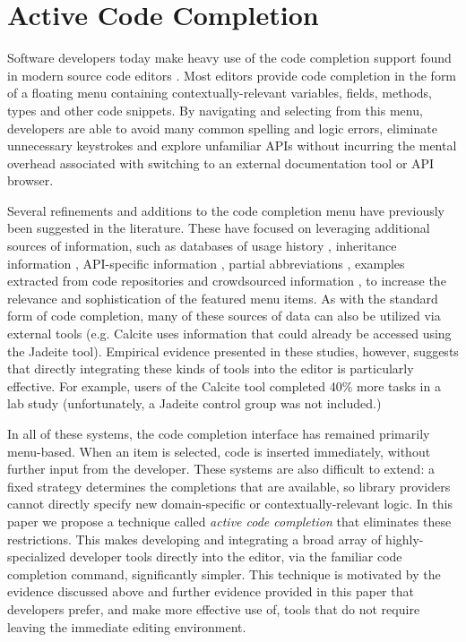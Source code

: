\section{Active Code Completion}\label{acc}
Software developers today make heavy use of the code completion support found in modern source code editors  \cite{murphy_how_2006}. Most editors provide code completion in the form of a floating menu containing  contextually-relevant variables, fields, methods, types and other code snippets. By navigating and selecting from this menu, developers are able to avoid many common spelling and logic errors, eliminate unnecessary keystrokes and explore unfamiliar APIs without incurring the mental overhead associated with switching to an external documentation tool or API browser.

Several refinements and additions to the code completion menu have previously been suggested in the literature. These have focused on leveraging additional sources of information, such as databases of usage history \cite{robbes_how_2008}\cite{HouPletcher2011}, inheritance information \cite{HouPletcher2011}, API-specific information \cite{HouPletcher2011}\cite{Lee+2008}, partial abbreviations \cite{Han+2009}, examples extracted from code repositories \cite{bruch_learning_2009}\cite{Brandt+2010} and crowdsourced information \cite{mooty_calcite:_2010}\cite{SnipMatch}, to increase the relevance and sophistication of the featured menu items. As with the standard form of code completion, many of these sources of data can also be utilized via external tools (e.g. Calcite \cite{mooty_calcite:_2010} uses information that could already be accessed using the Jadeite \cite{conf/vl/StylosFYM09} tool). Empirical evidence presented in these studies, however, suggests that directly integrating these kinds of tools into the editor is particularly effective. For example, users of the Calcite tool completed 40\% more tasks in a lab study (unfortunately, a Jadeite control group was not included.)

In all of these systems, the code completion interface has remained primarily menu-based. When an item is selected, code is inserted immediately, without further input from the developer. These systems are also difficult to extend: a fixed strategy determines the completions that are available, so library providers cannot directly specify new domain-specific or contextually-relevant logic. 
In this paper we propose a technique called {\it active code completion} that eliminates these restrictions. This  makes developing and integrating a broad array of highly-specialized developer tools directly into the editor, via the familiar code completion command, significantly simpler. This technique is motivated by the evidence discussed above and further evidence provided in this paper that developers prefer, and make more effective use of, tools that do not require leaving the immediate editing environment.

